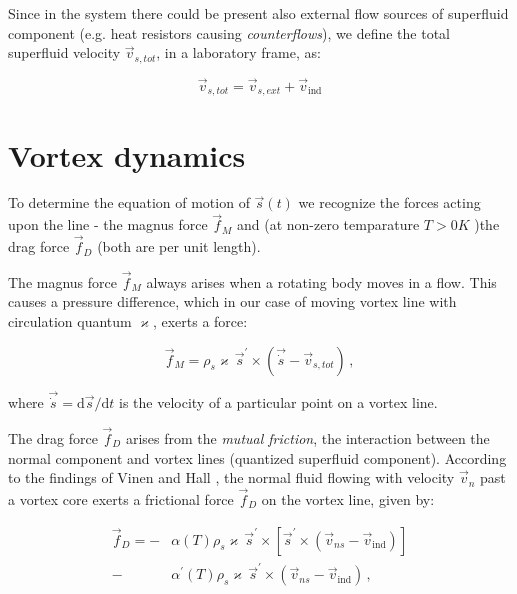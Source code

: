 Since in the system there could be present also external flow sources of superfluid component (e.g. heat resistors causing \textit{counterflows}), we define the total superfluid velocity $\vec{v}_{s,tot}$, in a laboratory frame, as:

\begin{equation}
\vec{v}_{s,tot} = \vec{v}_{s,ext} + \vec{v}_{\text{ind}}
\end{equation}

\newpage



\section{Vortex dynamics}

To determine the equation of motion of $\vec{s}(t)$ we recognize the forces acting upon the line - the magnus force $\vec{f}_M$ and (at non-zero temparature $T>0\unit{K}$ )the drag force $\vec{f}_D$ (both are per unit length).

The magnus force $\vec{f}_M$ always arises when a rotating body moves in a flow. This causes a pressure difference, which in our case of moving vortex line with circulation quantum $\varkappa$, exerts a force:

\begin{equation}
\vec{f}_M = \rho_s \varkappa \,\vec{s}^{\prime} \times (\vec{\dot{s}} - \vec{v}_{s,tot})\,,
\label{magnus}
\end{equation}

where $\vec{\dot{s}} = \text{d}\vec{s} / \text{d} t$ is the velocity of a particular point on a vortex line.

The drag force $\vec{f}_D$ arises from the \textit{mutual friction}, the interaction between the normal component and vortex lines (quantized superfluid component). According to the findings of Vinen and Hall \cite{vinen}, the normal fluid flowing with velocity $\vec{v}_n$ past a vortex core exerts a frictional force $\vec{f}_D$ on the vortex line, given by:

\begin{align}
\vec{f}_D = -& \alpha(T)\rho_s\varkappa\,\vec{s}^{\prime} \times [\vec{s}^{\prime} \times (\vec{v}_{ns} - \vec{v}_{\text{ind}})]
\label{alpha1}
\\
-& \alpha^{\prime}(T)\rho_s\varkappa\,\vec{s}^{\prime} \times (\vec{v}_{ns} - \vec{v}_{\text{ind}})
\,,
\label{alpha2}
\end{align}

